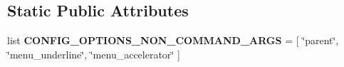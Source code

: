 \subsection*{Static Public Attributes}
\begin{DoxyCompactItemize}
\item 
list {\bfseries C\+O\+N\+F\+I\+G\+\_\+\+O\+P\+T\+I\+O\+N\+S\+\_\+\+N\+O\+N\+\_\+\+C\+O\+M\+M\+A\+N\+D\+\_\+\+A\+R\+GS} = \mbox{[} \char`\"{}parent\char`\"{}, \char`\"{}menu\+\_\+underline\char`\"{}, \char`\"{}menu\+\_\+accelerator\char`\"{} \mbox{]}\hypertarget{classnegui_1_1pgmenubuilder_1_1PGMenuBuilder_ae546003717fb9974243ea7bd53540e4e}{}\label{classnegui_1_1pgmenubuilder_1_1PGMenuBuilder_ae546003717fb9974243ea7bd53540e4e}

\end{DoxyCompactItemize}


